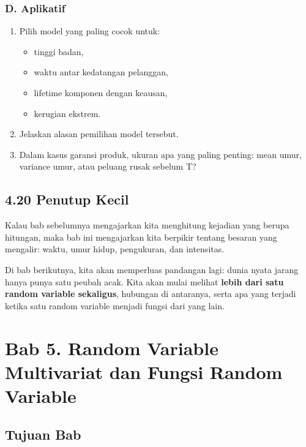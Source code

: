 \documentclass[
  letterpaper,
  DIV=11,
  numbers=noendperiod]{scrreprt}
\providecommand{\tightlist}{%
  \setlength{\itemsep}{0pt}\setlength{\parskip}{0pt}}
\begin{document}
\subsection{D. Aplikatif}\label{d.-aplikatif-2}

\begin{enumerate}
\def\labelenumi{\arabic{enumi}.}
\tightlist
\item
  Pilih model yang paling cocok untuk:

  \begin{itemize}
  \tightlist
  \item
    tinggi badan,
  \item
    waktu antar kedatangan pelanggan,
  \item
    lifetime komponen dengan keausan,
  \item
    kerugian ekstrem.
  \end{itemize}
\item
  Jelaskan alasan pemilihan model tersebut.
\item
  Dalam kasus garansi produk, ukuran apa yang paling penting: mean umur,
  variance umur, atau peluang rusak sebelum T?
\end{enumerate}

\section{4.20 Penutup Kecil}\label{penutup-kecil-3}

Kalau bab sebelumnya mengajarkan kita menghitung kejadian yang berupa
hitungan, maka bab ini mengajarkan kita berpikir tentang besaran yang
mengalir: waktu, umur hidup, pengukuran, dan intensitas.

Di bab berikutnya, kita akan memperluas pandangan lagi: dunia nyata
jarang hanya punya satu peubah acak. Kita akan mulai melihat
\textbf{lebih dari satu random variable sekaligus}, hubungan di
antaranya, serta apa yang terjadi ketika satu random variable menjadi
fungsi dari yang lain.


\chapter{Bab 5. Random Variable Multivariat dan Fungsi Random
Variable}\label{bab-5.-random-variable-multivariat-dan-fungsi-random-variable}

\section{Tujuan Bab}\label{tujuan-bab-4}
\end{document}
